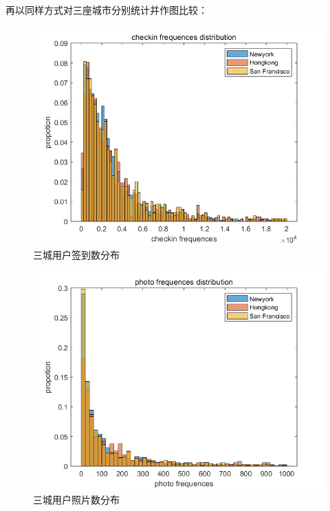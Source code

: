 \documentclass[UTF8]{ctexart}
\begin{document}
		再以同样方式对三座城市分别统计并作图比较：
		
		\begin{figure}[H]
			\centering
			\includegraphics[scale=0.4]{checkinDis_all_nhs.png}
			\caption{三城用户签到数分布}
			\label{cd_nhs}
		\end{figure}
		\begin{figure}[H]
			\centering
			\includegraphics[scale=0.4]{photoDis_all_nhs.png}
			\caption{三城用户照片数分布}
			\label{pd_nhs}
		\end{figure}
\end{document}

